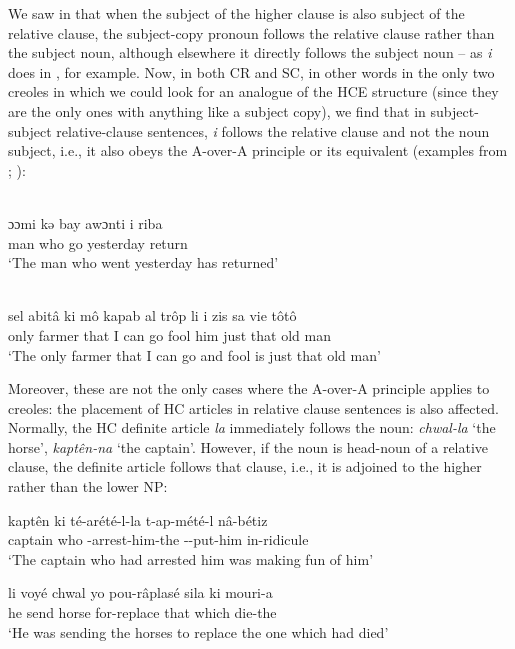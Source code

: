 We saw in  that when the subject of the higher clause is also subject of the relative clause, the subject-copy pronoun follows the relative clause rather than the subject noun, although elsewhere it directly follows the subject noun -- as \textit{i} does in , for example. Now, in both CR and SC, in other words in the only two creoles in which we could look for an analogue of the HCE structure (since they are the only ones with anything like a subject copy), we find that in subject-subject relative-clause sentences, \textit{i} follows the relative clause and not the noun subject, i.e., it also obeys the A-over-A principle or its equivalent (examples from \citealt[30]{Wilson1962}; \citealt[53]{Corne1977}):

\ea\label{ex:2:48}
\ili{\langCR}\\
 \gll ɔɔmi kə bay awɔnti i riba\\
man who go yesterday {\PM} return\\
\glt `The man who went yesterday has returned'
\z

\ea\label{ex:2:49}
\ili{\langSC}\\
 \gll sel abit{\^a} ki m{\^o} kapab al tr{\^o}p li i zis sa vie t{\^o}t{\^o}\\
 only farmer that I can go fool him {\PM} just that old man  \\
\glt `The only farmer that I can go and fool is just that old man'
\z

Moreover, these are not the only cases where the A-over-A principle applies to creoles: the placement of HC articles in relative\-
clause sentences is also affected. Normally, the HC definite article \textit{la} immediately follows the noun: \textit{chwal-la} `the horse', \textit{kapt{\^e}n-na} `the captain'. However, if the noun is head-noun of a relative clause, the definite article follows that clause, i.e., it is adjoined to the higher rather than the lower NP:

\ea\label{ex:2:50}
\gll kapt{\^e}n ki té-arété-l-la t-ap-mété-l n{\^a}-bétiz\\
captain who \TNS-arrest-him-the \TNS-\ASP-put-him in-ridicule\\
\glt  `The captain who had arrested him was making fun of him'
\z

\ea\label{ex:2:51}
 \gll li voyé chwal yo pou-r{\^a}plasé sila ki mouri-a\\
he send horse {\PL} for-replace that which die-the\\
\glt `He was sending the horses to replace the one which had died'
\z

